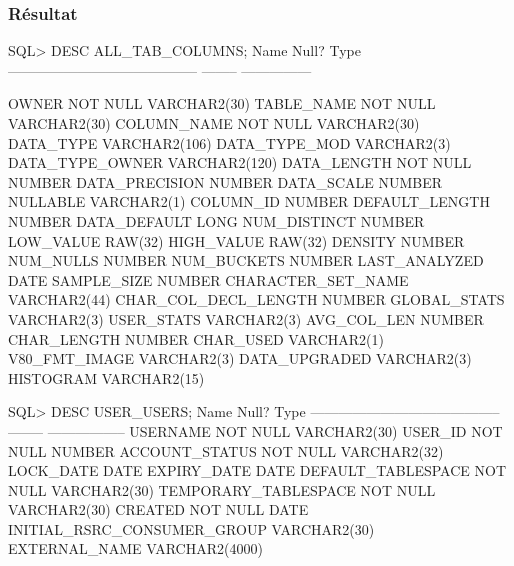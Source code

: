 \documentclass[•]{article}
\begin{document}
\subsubsection{Résultat}
\begin{sql}
SQL> DESC ALL_TAB_COLUMNS; 
 Name                                      Null?    Type
 ----------------------------------------- -------- ---------------

 OWNER                                     NOT NULL VARCHAR2(30)
 TABLE_NAME                                NOT NULL VARCHAR2(30)
 COLUMN_NAME                               NOT NULL VARCHAR2(30)
 DATA_TYPE                                          VARCHAR2(106)
 DATA_TYPE_MOD                                      VARCHAR2(3)
 DATA_TYPE_OWNER                                    VARCHAR2(120)
 DATA_LENGTH                               NOT NULL NUMBER
 DATA_PRECISION                                     NUMBER
 DATA_SCALE                                         NUMBER
 NULLABLE                                           VARCHAR2(1)
 COLUMN_ID                                          NUMBER
 DEFAULT_LENGTH                                     NUMBER
 DATA_DEFAULT                                       LONG
 NUM_DISTINCT                                       NUMBER
 LOW_VALUE                                          RAW(32)
 HIGH_VALUE                                         RAW(32)
 DENSITY                                            NUMBER
 NUM_NULLS                                          NUMBER
 NUM_BUCKETS                                        NUMBER
 LAST_ANALYZED                                      DATE
 SAMPLE_SIZE                                        NUMBER
 CHARACTER_SET_NAME                                 VARCHAR2(44)
 CHAR_COL_DECL_LENGTH                               NUMBER
 GLOBAL_STATS                                       VARCHAR2(3)
 USER_STATS                                         VARCHAR2(3)
 AVG_COL_LEN                                        NUMBER
 CHAR_LENGTH                                        NUMBER
 CHAR_USED                                          VARCHAR2(1)
 V80_FMT_IMAGE                                      VARCHAR2(3)
 DATA_UPGRADED                                      VARCHAR2(3)
 HISTOGRAM                                          VARCHAR2(15)

SQL> DESC USER_USERS;
 Name                                      Null?    Type
 ----------------------------------------- -------- -----------------
 USERNAME                                  NOT NULL VARCHAR2(30)
 USER_ID                                   NOT NULL NUMBER
 ACCOUNT_STATUS                            NOT NULL VARCHAR2(32)
 LOCK_DATE                                          DATE
 EXPIRY_DATE                                        DATE
 DEFAULT_TABLESPACE                        NOT NULL VARCHAR2(30)
 TEMPORARY_TABLESPACE                      NOT NULL VARCHAR2(30)
 CREATED                                   NOT NULL DATE
 INITIAL_RSRC_CONSUMER_GROUP                        VARCHAR2(30)
 EXTERNAL_NAME                                      VARCHAR2(4000)



\end{sql}
\end{document}
